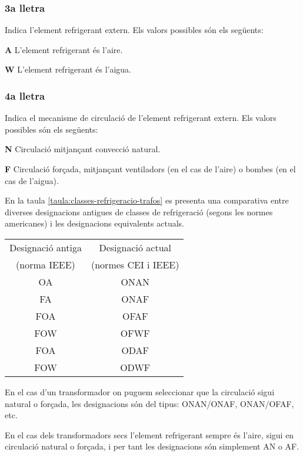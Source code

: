 \subsubsection*{3a lletra}
 Indica l'element refrigerant extern. Els valors
possibles són els següents:

\begin{list}{}
   {\setlength{\labelwidth}{10mm} \setlength{\leftmargin}{10mm} \setlength{\labelsep}{2mm}}
   \item[\textbf{A}] L'element refrigerant és l'aire.
   \item[\textbf{W}] L'element refrigerant és l'aigua.
\end{list}
 

\subsubsection*{4a lletra}
 Indica el mecanisme de circulació de l'element
refrigerant extern. Els valors possibles són els següents:
\begin{list}{}
   {\setlength{\labelwidth}{10mm} \setlength{\leftmargin}{10mm} \setlength{\labelsep}{2mm}}
   \item[\textbf{N}] Circulació mitjançant convecció natural.
   \item[\textbf{F}] Circulació forçada, mitjançant ventiladors (en el cas de
   l'aire) o bombes (en el cas de l'aigua).
\end{list}
 

En la taula \vref{taula:classes-refrigeracio-trafos} es presenta una
comparativa entre diverses designacions antigues de classes de
refrigeració (segons les normes americanes) i les designacions
equivalents actuals.

\begin{center}
   \label{taula:classes-refrigeracio-trafos}
   \begin{tabular}{cc}
   \toprule[1pt]
   Designació antiga & Designació actual \\
   (norma IEEE)     & (normes CEI i IEEE) \\
   \midrule
   OA & ONAN   \\
   FA & ONAF   \\
   FOA & OFAF  \\
   FOW & OFWF  \\
   FOA & ODAF  \\
   FOW & ODWF \\
   \bottomrule[1pt]
   \end{tabular}
\end{center}

En el cas d'un transformador on puguem seleccionar que la circulació
sigui natural o forçada,
les designacions són del tipus: ONAN/ONAF, ONAN/OFAF, etc.

En el cas dels transformadors secs l'element refrigerant sempre és
l'aire, sigui en circulació natural o forçada, i per tant les
designacions són simplement AN o AF.

